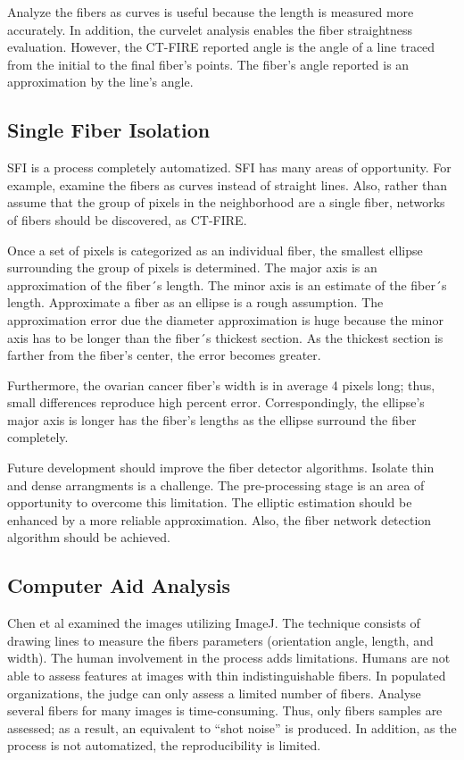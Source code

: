 \documentclass[12pt,a4paper]{article}
\begin{document}
Analyze the fibers as curves is useful because the length is measured more accurately. In addition, the curvelet analysis enables the fiber straightness evaluation. However,  the CT-FIRE reported angle is the angle of a line traced from the initial to the final fiber's points. The fiber's angle reported is an approximation by the line's angle. 

\subsection{Single Fiber Isolation}

SFI is a process completely automatized. SFI has many areas of opportunity. For example, examine the fibers as curves instead of straight lines. Also, rather than assume that the group of pixels in the neighborhood are a single fiber, networks of fibers should be discovered, as CT-FIRE.

Once a set of pixels is categorized as an individual fiber, the smallest ellipse surrounding the group of pixels is determined. The major axis is an approximation of the fiber´s length. The minor axis is an estimate of the fiber´s length. Approximate a fiber as an ellipse is a rough assumption. The approximation error due the diameter approximation is huge because the minor axis has to be longer than the fiber´s thickest section. As the thickest section is farther from the fiber's center, the error becomes greater.

Furthermore, the ovarian cancer fiber's width is in average 4 pixels long; thus, small differences reproduce high percent error. Correspondingly, the ellipse's major axis is longer has the fiber's lengths as the ellipse surround the fiber completely. 

Future development should improve the fiber detector algorithms. Isolate thin and dense arrangments is a challenge. The pre-processing stage is an area of opportunity to overcome this limitation. The elliptic estimation should be enhanced by a more reliable approximation. Also, the fiber network detection algorithm should be achieved.

\subsection{Computer Aid Analysis}

Chen et al examined the images utilizing ImageJ. The technique consists of drawing lines to measure the fibers parameters (orientation angle, length, and width). The human involvement in the process adds limitations. Humans are not able to assess features at images with thin indistinguishable fibers. In populated organizations, the judge can only assess a limited number of fibers. Analyse several fibers for many images is time-consuming. Thus, only fibers samples are assessed; as a result, an equivalent to “shot noise” is produced. In addition, as the process is not automatized, the reproducibility is limited.
\end{document}

